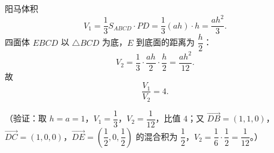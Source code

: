 \begin{answer}

阳马体积
\nopagebreak[4]
\[
V_1=\frac13 S_{ABCD}\cdot PD=\frac13(ah)\cdot h=\frac{ah^2}{3}.
\]
四面体 \(EBCD\) 以 \(\triangle BCD\) 为底，\(E\) 到底面的距离为 \(\dfrac h2\)：
\nopagebreak[4]
\[
V_2=\frac13\cdot\frac{ah}{2}\cdot\frac h2=\frac{ah^2}{12}.
\]
故
\nopagebreak[4]
\[
\frac{V_1}{V_2}=4.
\]

（验证：取 \(h=a=1\)，\(V_1=\dfrac13\)，\(V_2=\dfrac1{12}\)，比值 \(4\)；又 \(\overrightarrow{DB}=(1,1,0)\)，\(\overrightarrow{DC}=(1,0,0)\)，\(\overrightarrow{DE}=\left(\dfrac12,0,\dfrac12\right)\) 的混合积为 \(\dfrac12\)，\(V_2=\dfrac16\cdot\dfrac12=\dfrac1{12}\)。）



\end{answer}
